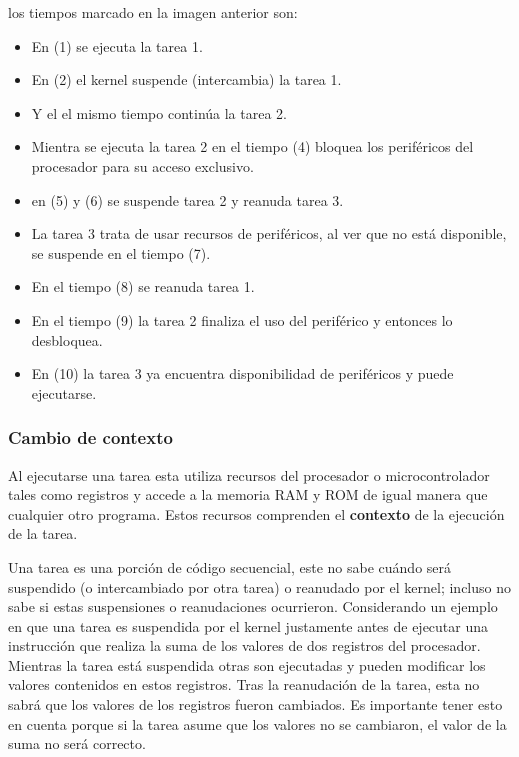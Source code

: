 los tiempos marcado en la imagen anterior son:

\begin{itemize}
    \item En (1) se ejecuta la tarea 1.
    \item En (2) el kernel suspende (intercambia) la tarea 1.
    \item Y el el mismo tiempo continúa la tarea 2.
    \item Mientra se ejecuta la tarea 2 en el tiempo (4) bloquea los periféricos del procesador para su acceso exclusivo.
    \item en (5) y (6) se suspende tarea 2 y reanuda tarea 3.
    \item La tarea 3 trata de usar recursos de periféricos, al ver que no está disponible, se suspende en el tiempo (7).
    \item En el tiempo (8) se reanuda tarea 1.
    \item En el tiempo (9) la tarea 2 finaliza el uso del periférico y entonces lo desbloquea.
    \item En (10) la tarea 3 ya encuentra disponibilidad de periféricos y puede ejecutarse.
\end{itemize}

\subsubsection{Cambio de contexto}

Al ejecutarse una tarea esta utiliza recursos del procesador o microcontrolador tales como registros y accede a la memoria RAM y ROM de igual manera que cualquier otro programa. Estos recursos comprenden el \textbf{contexto} de la ejecución de la tarea.

Una tarea es una porción de código secuencial, este no sabe cuándo será suspendido (o intercambiado por otra tarea) o reanudado por el kernel; incluso no sabe si estas suspensiones o reanudaciones ocurrieron. Considerando un ejemplo en que una tarea es suspendida por el kernel justamente antes de ejecutar una instrucción que realiza la suma de los valores de dos registros del procesador. Mientras la tarea está suspendida otras son ejecutadas y pueden modificar los valores contenidos en estos registros. Tras la reanudación de la tarea, esta no sabrá que los valores de los registros fueron cambiados. Es importante tener esto en cuenta porque si la tarea asume que los valores no se cambiaron, el valor de la suma no será correcto. \\

